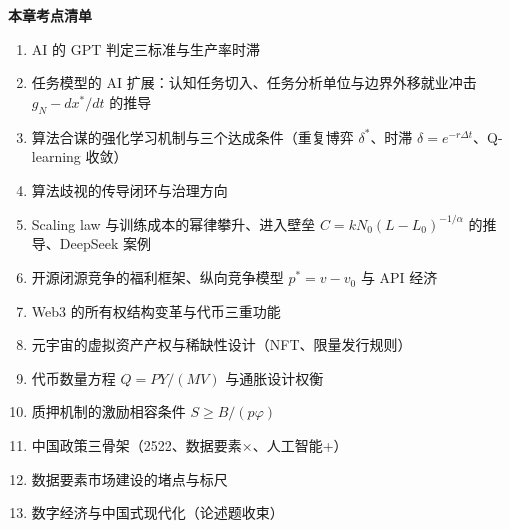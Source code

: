\begin{chapterbox}
\textbf{本章考点清单}

\begin{enumerate}
\item AI 的 GPT 判定三标准与生产率时滞 
\item 任务模型的 AI 扩展：认知任务切入、任务分析单位与边界外移就业冲击 $g_N - dx^*/dt$ 的推导 
\item 算法合谋的强化学习机制与三个达成条件（重复博弈 $\delta^*$、时滞 $\delta=e^{-r\Delta t}$、Q-learning 收敛） 
\item 算法歧视的传导闭环与治理方向 
\item Scaling law 与训练成本的幂律攀升、进入壁垒 $C = kN_0(L-L_0)^{-1/\alpha}$ 的推导、DeepSeek 案例 
\item 开源闭源竞争的福利框架、纵向竞争模型 $p^* = v - v_0$ 与 API 经济 
\item Web3 的所有权结构变革与代币三重功能 
\item 元宇宙的虚拟资产产权与稀缺性设计（NFT、限量发行规则）
\item 代币数量方程 $Q = PY/(MV)$ 与通胀设计权衡 
\item 质押机制的激励相容条件 $S \geq B/(p\varphi)$ 
\item 中国政策三骨架（2522、数据要素×、人工智能+）
\item 数据要素市场建设的堵点与标尺 
\item 数字经济与中国式现代化（论述题收束）
\end{enumerate}
\end{chapterbox}
